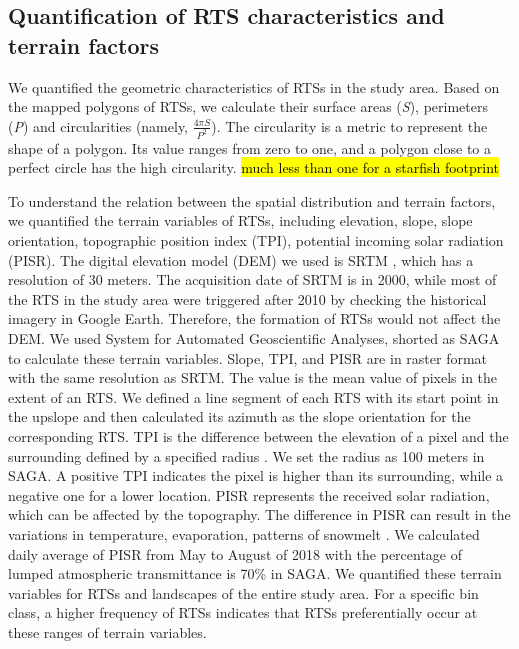 \documentclass[preprint,12pt,authoryear]{elsarticle}
\begin{document}
\subsection{Quantification of RTS characteristics and terrain factors}
\label{subsec_quantify_rts}

We quantified the geometric characteristics of RTSs in the study area. Based on the mapped polygons of RTSs, we calculate their surface areas (\emph{S}), perimeters (\emph{P}) and circularities (namely, $\frac{4 \pi S}{P^2} $). The circularity is a metric to represent the shape of a polygon. Its value ranges from zero to one, and a polygon close to a perfect circle has the high circularity. \hl{much less than one for a starfish footprint}

To understand the relation between the spatial distribution and terrain factors, we quantified the terrain variables of RTSs, including elevation, slope, slope orientation, topographic position index (TPI), potential incoming solar radiation (PISR). The digital elevation model (DEM) we used is SRTM \citep{farr2007shuttle}, which has a resolution of 30 meters. The acquisition date of SRTM is in 2000, while most of the RTS in the study area were triggered after 2010 by checking the historical imagery in Google Earth. Therefore, the formation of RTSs would not affect the DEM. We used System for Automated Geoscientific Analyses, shorted as SAGA \citep{conrad2015system} to calculate these terrain variables. Slope, TPI, and PISR are in raster format with the same resolution as SRTM. The value is the mean value of pixels in the extent of an RTS. We defined a line segment of each RTS with its start point in the upslope and then calculated its azimuth as the slope orientation for the corresponding RTS. TPI is the difference between the elevation of a pixel and the surrounding defined by a specified radius \citep{guisan1999glm, reu2013application}. We set the radius as 100 meters in SAGA. A positive TPI indicates the pixel is higher than its surrounding, while a negative one for a lower location. PISR represents the received solar radiation, which can be affected by the topography. The difference in PISR can result in the variations in temperature, evaporation, patterns of snowmelt \citep{bohner2009land}. We calculated daily average of PISR from May to August of 2018 with the percentage of lumped atmospheric transmittance is 70\% in SAGA. We quantified these terrain variables for RTSs and landscapes of the entire study area. For a specific bin class, a higher frequency of RTSs indicates that RTSs preferentially occur at these ranges of terrain variables. 
\end{document}
